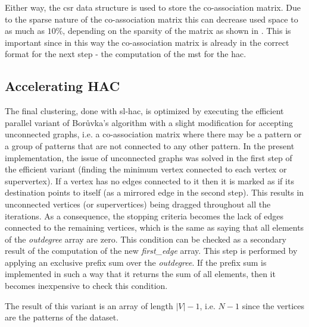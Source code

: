 Either way, the \gls{csr} data structure is used to store the co-association matrix. 
Due to the sparse nature of the co-association matrix this can decrease used space to as much as $10\%$, depending on the sparsity of the matrix as shown in \cite{Lourenco2010}. 
This is important since in this way the co-association matrix is already in the correct format for the next step - the computation of the \gls{mst} for the \gls{hac}.

\subsection{Accelerating HAC}

The final clustering, done with \gls{sl-hac}, is optimized by executing the efficient parallel variant of Borůvka's algorithm \cite{Sousa2015} with a slight modification for accepting unconnected graphs, i.e. a co-association matrix where there may be a pattern or a group of patterns that are not connected to any other pattern.
In the present implementation, the issue of unconnected graphs was solved in the first step of the efficient variant (finding the minimum vertex connected to each vertex or supervertex). If a vertex has no edges connected to it then it is marked as if its destination points to itself (as a mirrored edge in the second step). This results in unconnected vertices (or supervertices) being dragged throughout all the iterations.
As a consequence, the stopping criteria becomes the lack of edges connected to the remaining vertices, which is the same as saying that all elements of the \emph{outdegree} array are zero. This condition can be checked as a secondary result of the computation of the new \emph{first\_edge} array. This step is performed by applying an exclusive prefix sum over the \emph{outdegree}. If the prefix sum is implemented in such a way that it returns the sum of all elements, then it becomes inexpensive to check this condition.

The result of this variant is an array of length $|V|-1$, i.e. $N-1$ since the vertices are the patterns of the dataset. 




